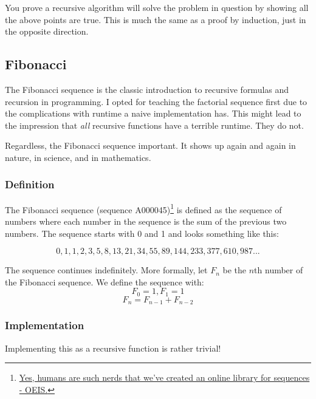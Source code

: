 You prove a recursive algorithm will solve the problem in question by showing all the above points are true.  
This is much the same as a proof by induction, just in the opposite direction.

\subsection{Fibonacci}

The Fibonacci sequence is the classic introduction to recursive formulas and recursion in programming.  I opted for teaching the factorial sequence first due to the complications with runtime a naive implementation has.  This might lead to the impression that \textit{all} recursive functions have a terrible runtime.  They do not.  


Regardless, the Fibonacci sequence important.  It shows up again and again in nature, in science, and in mathematics.



\subsubsection{Definition}
The Fibonacci sequence  (sequence A000045)\footnote{\href{https://oeis.org/}{Yes, humans are such nerds that we've created an online library for sequences - OEIS.}} is defined as the sequence of numbers where each number in the sequence is the sum of the previous two numbers.  The sequence starts with 0 and 1  and looks something like this:

$$0, 1, 1, 2, 3, 5, 8, 13, 21, 34, 55, 89, 144, 233, 377, 610, 987...$$

The sequence continues indefinitely. More formally, let $F_n$ be the $n$th number of the Fibonacci sequence. We define the sequence with:
$$ F_{0} = 1, F_{1} = 1$$
$$ F_n = F_{n-1} + F_{n-2}$$


\subsubsection{Implementation}
Implementing this as a recursive function is rather trivial!

